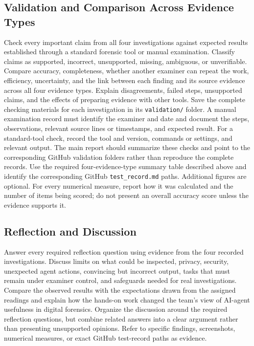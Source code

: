 \documentclass[12pt,letterpaper]{article}
\begin{document}
\subsection{Validation and Comparison Across Evidence Types}
Check every important claim from all four investigations against expected results established through a standard forensic tool or manual examination. Classify claims as supported, incorrect, unsupported, missing, ambiguous, or unverifiable. Compare accuracy, completeness, whether another examiner can repeat the work, efficiency, uncertainty, and the link between each finding and its source evidence across all four evidence types. Explain disagreements, failed steps, unsupported claims, and the effects of preparing evidence with other tools.
Save the complete checking materials for each investigation in its \texttt{validation/} folder. A manual examination record must identify the examiner and date and document the steps, observations, relevant source lines or timestamps, and expected result. For a standard-tool check, record the tool and version, commands or settings, and relevant output. The main report should summarize these checks and point to the corresponding GitHub validation folders rather than reproduce the complete records.
Use the required four-evidence-type summary table described above and identify the corresponding GitHub \texttt{test\_record.md} paths. Additional figures are optional. For every numerical measure, report how it was calculated and the number of items being scored; do not present an overall accuracy score unless the evidence supports it.

\subsection{Reflection and Discussion}
Answer every required reflection question using evidence from the four recorded investigations. Discuss limits on what could be inspected, privacy, security, unexpected agent actions, convincing but incorrect output, tasks that must remain under examiner control, and safeguards needed for real investigations. Compare the observed results with the expectations drawn from the assigned readings and explain how the hands-on work changed the team's view of AI-agent usefulness in digital forensics.
Organize the discussion around the required reflection questions, but combine related answers into a clear argument rather than presenting unsupported opinions. Refer to specific findings, screenshots, numerical measures, or exact GitHub test-record paths as evidence.
\end{document}
